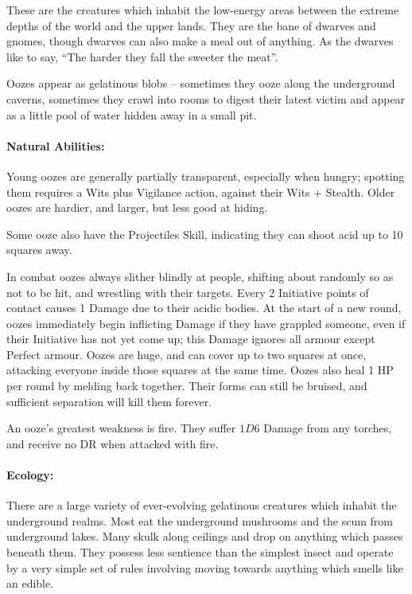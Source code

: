 \begin{multicols}{2}

\noindent
These are the creatures which inhabit the low-energy areas between the extreme depths of the world and the upper lands.
They are the bane of dwarves and gnomes, though dwarves can also make a meal out of anything.
As the dwarves like  to say, ``The harder they fall the sweeter the meat''.

\label{ooze}

Oozes appear as gelatinous blobs -- sometimes they ooze along the underground caverns, sometimes they crawl into rooms to digest their latest victim and appear as a little pool of water hidden away in a small pit.

\paragraph{Natural Abilities:} Young oozes are generally partially transparent, especially when hungry; spotting them requires a Wits plus Vigilance action, against their Wits + Stealth.
Older oozes are hardier, and larger, but less good at hiding.

Some ooze also have the Projectiles Skill, indicating they can shoot acid up to 10 squares away.

In combat oozes always slither blindly at people, shifting about randomly so as not to be hit, and wrestling with their targets.
Every 2 Initiative points of contact causes 1 Damage due to their acidic bodies.
At the start of a new round, oozes immediately begin inflicting Damage if they have grappled someone, even if their Initiative has not yet come up; this Damage ignores all armour except Perfect armour.
Oozes are huge, and can cover up to two squares at once, attacking everyone inside those squares at the same time.
Oozes also heal 1 HP per round by melding back together.
Their forms can still be bruised, and sufficient separation will kill them forever.

An ooze's greatest weakness is fire.
They suffer $1D6$ Damage from any torches, and receive no DR when attacked with fire.

\paragraph{Ecology:} There are a large variety of ever-evolving gelatinous creatures which inhabit the underground realms.  Most eat the underground mushrooms and the scum from underground lakes.  Many skulk along ceilings and drop on anything which passes beneath them.  They possess less sentience than the simplest insect and operate by a very simple set of rules involving moving towards anything which smells like an edible.


\end{multicols}
